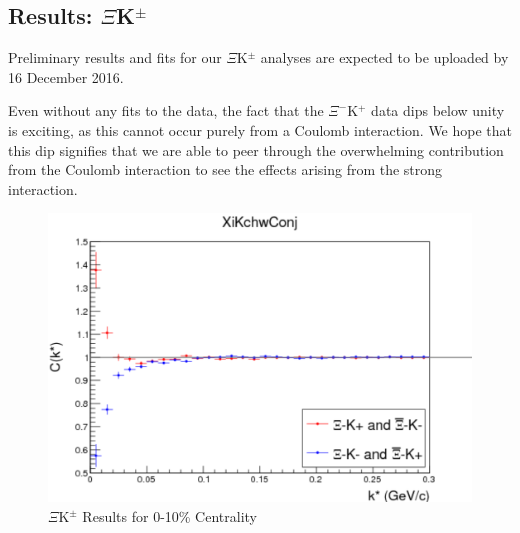 \documentclass[../AnalysisNoteJBuxton.tex]{subfiles}
\begin{document}
\subsection{Results: \texorpdfstring{$\Xi$K$^{\pm}$}{TEXT}}
\label{ResultsXiK}

Preliminary results and fits for our $\Xi$K$^{\pm}$ analyses are expected to be uploaded by 16 December 2016.

Even without any fits to the data, the fact that the $\Xi^{-}$K$^{+}$ data dips below unity is exciting, as this cannot occur purely from a Coulomb interaction.  We hope that this dip signifies that we are able to peer through the overwhelming contribution from the Coulomb interaction to see the effects arising from the strong interaction.

\begin{figure}[h]
  \centering
  \includegraphics[width=\textwidth]{7_ResultsAndDiscussion/Figures/XiKchwConjKStarCf.pdf}
  \caption[$\Xi$K$^{\pm}$ Results]{$\Xi$K$^{\pm}$ Results for 0-10\% Centrality}
  \label{fig:XiKchwConjResults}
\end{figure}
\end{document}
